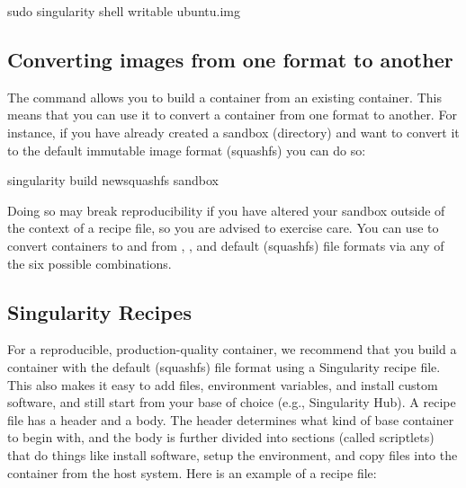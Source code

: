 \documentclass[letterpaper,10pt,english]{sphinxmanual}
\begin{document}
%
\begin{sphinxVerbatim}[commandchars=\\\{\}]
\PYGZdl{} sudo singularity shell \PYGZhy{}\PYGZhy{}writable ubuntu.img
\end{sphinxVerbatim}


\subsection{Converting images from one format to another}
\label{\detokenize{quick_start:converting-images-from-one-format-to-another}}
\begin{DUlineblock}{0em}
\item[] The  command allows you to build a container from an existing
container. This means that you can use it to convert a container from
one format to another. For instance, if you have already created a
sandbox (directory) and want to convert it to the default immutable
image format (squashfs) you can do so:
\end{DUlineblock}

%
\begin{sphinxVerbatim}[commandchars=\\\{\}]
\PYGZdl{} singularity build new\PYGZhy{}squashfs sandbox
\end{sphinxVerbatim}

Doing so may break reproducibility if you have altered your sandbox
outside of the context of a recipe file, so you are advised to
exercise care.
You can use  to convert containers to and from , , and default
(squashfs) file formats via any of the six possible combinations.


\subsection{Singularity Recipes}
\label{\detokenize{quick_start:singularity-recipes}}
For a reproducible, production-quality container, we recommend that
you build a container with the default (squashfs) file format using a
Singularity recipe file. This also makes it easy to add files,
environment variables, and install custom software, and still start
from your base of choice (e.g., Singularity Hub).
A recipe file has a header and a body. The header determines what kind
of base container to begin with, and the body is further divided into
sections (called scriptlets) that do things like install software,
setup the environment, and copy files into the container from the host
system.
Here is an example of a recipe file:
\end{document}
